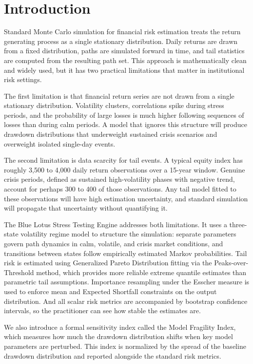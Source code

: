 \documentclass[12pt]{article}
\begin{document}
\section{Introduction}

Standard Monte Carlo simulation for financial risk estimation treats the return
generating process as a single stationary distribution. Daily returns are drawn from
a fixed distribution, paths are simulated forward in time, and tail statistics are
computed from the resulting path set. This approach is mathematically clean and widely
used, but it has two practical limitations that matter in institutional risk settings.

The first limitation is that financial return series are not drawn from a single stationary
distribution. Volatility clusters, correlations spike during stress periods, and the
probability of large losses is much higher following sequences of losses than during
calm periods. A model that ignores this structure will produce drawdown distributions
that underweight sustained crisis scenarios and overweight isolated single-day events.

The second limitation is data scarcity for tail events. A typical equity index has
roughly 3,500 to 4,000 daily return observations over a 15-year window. Genuine
crisis periods, defined as sustained high-volatility phases with negative trend,
account for perhaps 300 to 400 of those observations. Any tail model fitted to these
observations will have high estimation uncertainty, and standard simulation will
propagate that uncertainty without quantifying it.

The Blue Lotus Stress Testing Engine addresses both limitations. It uses a three-state
volatility regime model to structure the simulation: separate parameters govern
path dynamics in calm, volatile, and crisis market conditions, and transitions
between states follow empirically estimated Markov probabilities. Tail risk is
estimated using Generalized Pareto Distribution fitting via the Peaks-over-Threshold
method, which provides more reliable extreme quantile estimates than parametric tail
assumptions. Importance resampling under the Esscher measure is used to enforce
mean and Expected Shortfall constraints on the output distribution. And all scalar
risk metrics are accompanied by bootstrap confidence intervals, so the practitioner
can see how stable the estimates are.

We also introduce a formal sensitivity index called the Model Fragility Index, which
measures how much the drawdown distribution shifts when key model parameters are
perturbed. This index is normalized by the spread of the baseline drawdown distribution
and reported alongside the standard risk metrics.
\end{document}
